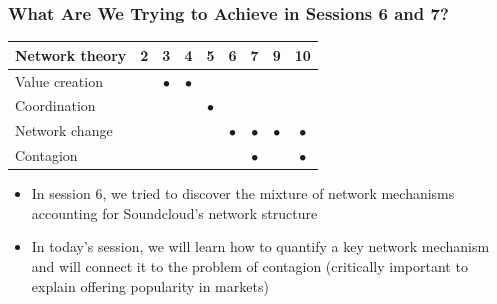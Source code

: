 \documentclass[notes, aspectratio=1610]{beamer}
\begin{document}
\begin{frame}
	\frametitle{What Are We Trying to Achieve in Sessions 6 and 7?}
	\begin{table}
		\begin{tabular}[c]{l|c|c|c|c|c|c|c|c}
			\textbf{Network theory} & 
			\textbf{2} & 
			\textbf{3} & 
			\textbf{4} & 
			\textbf{5} & 
			\textbf{6} & 
			\textbf{7} & 
			\textbf{9} & 
			\textbf{10}\\
			\hline
			Value creation &  & $\bullet$ & $\bullet$ &  &  &  &  & \\	
			Coordination &  &  &  & $\bullet$ &  &  &  & \\	
			Network change &  &  &  &  & $\bullet$ & $\bullet$ & $\bullet$ & $\bullet$\\	
			Contagion &  &  &  &  &  & $\bullet$ &  & $\bullet$ \\	
		\end{tabular}
	\end{table}

	\pause

	\begin{itemize}
		\item In session 6, we tried to discover the 
		mixture of network 
		mechanisms accounting for Soundcloud's network structure
		\pause
		\item In today's session, we will learn how to quantify a key 
		network mechanism and will connect it to the problem 
		of contagion (critically important to explain offering 
		popularity in markets)
	\end{itemize}
\end{frame}
\end{document}
